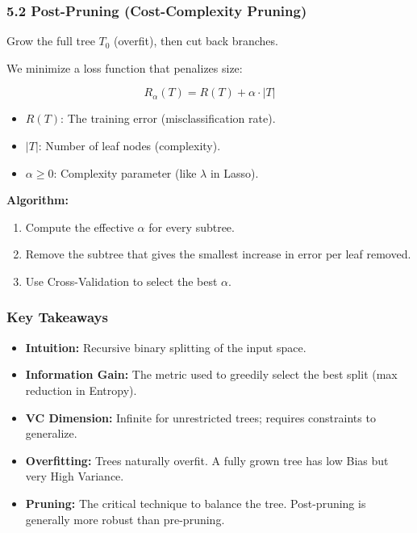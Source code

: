 \documentclass[
  italian,
  11pt,
]{article}
\begin{document}
\subsubsection{5.2 Post-Pruning (Cost-Complexity
Pruning)}\label{post-pruning-cost-complexity-pruning}

Grow the full tree \(T_0\) (overfit), then cut back branches.

We minimize a loss function that penalizes size:

\[R_\alpha(T) = R(T) + \alpha \cdot |T|\]

\begin{itemize}
\item
  \(R(T)\): The training error (misclassification rate).
\item
  \(|T|\): Number of leaf nodes (complexity).
\item
  \(\alpha \geq 0\): Complexity parameter (like \(\lambda\) in Lasso).
\end{itemize}

\textbf{Algorithm:}

\begin{enumerate}
\def\labelenumi{\arabic{enumi}.}
\item
  Compute the effective \(\alpha\) for every subtree.
\item
  Remove the subtree that gives the smallest increase in error per leaf
  removed.
\item
  Use Cross-Validation to select the best \(\alpha\).
\end{enumerate}

\subsubsection{Key Takeaways}\label{key-takeaways-17}

\begin{itemize}
\item
  \textbf{Intuition:} Recursive binary splitting of the input space.
\item
  \textbf{Information Gain:} The metric used to greedily select the best
  split (max reduction in Entropy).
\item
  \textbf{VC Dimension:} Infinite for unrestricted trees; requires
  constraints to generalize.
\item
  \textbf{Overfitting:} Trees naturally overfit. A fully grown tree has
  low Bias but very High Variance.
\item
  \textbf{Pruning:} The critical technique to balance the tree.
  Post-pruning is generally more robust than pre-pruning.

  \newpage
\end{itemize}
\end{document}
